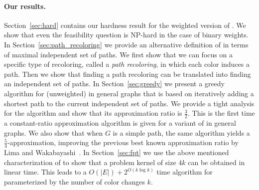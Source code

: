 \paragraph{Our results.}
%
Section~\ref{sec:hard} contains our hardness result for the weighted
version of \TWOCR{}.  We show that even the \TWOCR{} feasibility question is 
NP-hard in the case of binary weights.
%
In Section~\ref{sec:path_recoloring} we provide
an alternative definition of \TWOCR{} in terms of maximal independent
set of paths.
%
We first show that we can focus on a specific type of recoloring,
called a \emph{path recoloring},
in which each color induces a path.
%
Then we show that finding a path recoloring can be translated 
into finding an independent set of paths.
%
In Section~\ref{sec:greedy} we present a greedy algorithm for
(unweighted) \TWOCR{} in general graphs that is based on iteratively
adding a shortest path to the current independent set of paths.
%
We provide a tight analysis for the algorithm and show
that its approximation ratio is $\frac{3}{2}$.
%
This is the first time a constant-ratio approximation algorithm is
given for a variant of
\CRP{} in general graphs.
%
We also show that when $G$ is a simple path, 
the same algorithm yields a $\frac{5}{4}$-approximation, 
improving the previous best known approximation ratio by 
Lima and Wakabayashi~\cite{lima2014convex}.
%
In Section~\ref{sec:fpt} we use the above mentioned characterization
of \TWOCR{} to show that a problem kernel of size $4k$ can be obtained
in linear time.
%
This leads to a $O(|E|) + 2^{O(k \log k)}$ time algorithm for \TWOCR{} 
parameterized by the number of color changes $k$.